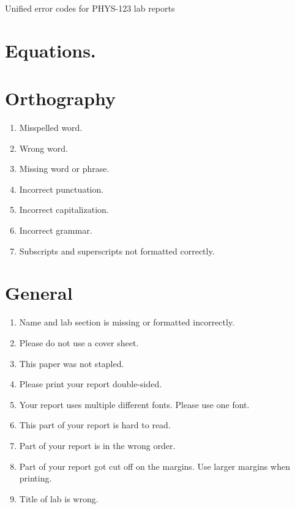 \documentclass[12pt,letterpaper]{article}
\begin{document}
\begin{center}
  Unified error codes for PHYS-123 lab reports
\end{center}

\section*{Equations.}

\begin{multicols}{2}

\section{Orthography}

\begin{enumerate}[start=10]
  \item Misspelled word.
  \item Wrong word.
  \item Missing word or phrase.
  \item Incorrect punctuation.
  \item Incorrect capitalization.
  \item Incorrect grammar.
  \item Subscripts and superscripts not formatted correctly.
\end{enumerate}

\section{General}

\begin{enumerate}[start=20]
  \item Name and lab section is missing or formatted incorrectly.
  \item Please do not use a cover sheet.
  \item This paper was not stapled.
  \item Please print your report double-sided.
  \item Your report uses multiple different fonts. Please use one font.
  \item This part of your report is hard to read.
  \item Part of your report is in the wrong order.
  \item Part of your report got cut off on the margins.
    Use larger margins when printing.
  \item Title of lab is wrong.
\end{enumerate}


\end{multicols}
\end{document}
